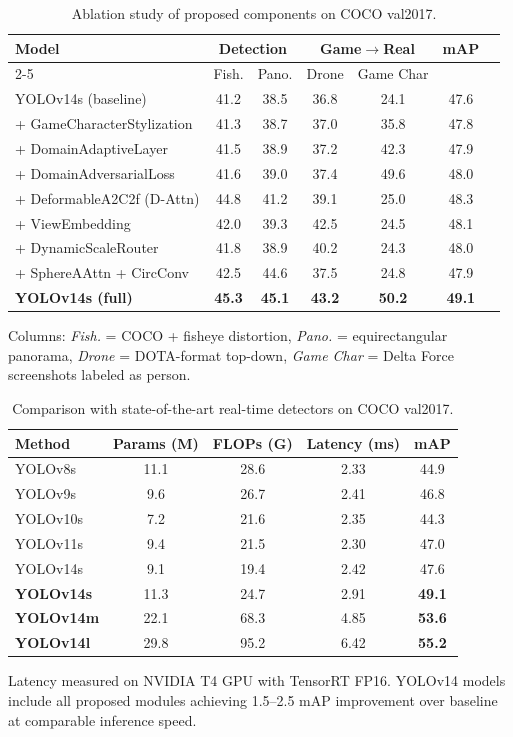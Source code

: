 \documentclass[10pt]{article}
\begin{document}
\begin{table}[t]
\centering
\caption{Ablation study of proposed components on COCO val2017.}
\label{tab:ablation}
\small
\begin{tabular}{lcccccc}
\toprule
\multirow{2}[0]{*}{Model} & \multicolumn{2}{c}{Detection} & \multicolumn{2}{c}{Game$\to$Real} & \multirow{2}[0]{*}{mAP} \\
\cmidrule{2-5}
 & Fish. & Pano. & Drone & Game Char & \\
\midrule
YOLOv14s (baseline) & 41.2 & 38.5 & 36.8 & 24.1 & 47.6 \\
\quad + GameCharacterStylization & 41.3 & 38.7 & 37.0 & 35.8 & 47.8 \\
\quad + DomainAdaptiveLayer & 41.5 & 38.9 & 37.2 & 42.3 & 47.9 \\
\quad + DomainAdversarialLoss & 41.6 & 39.0 & 37.4 & 49.6 & 48.0 \\
\quad + DeformableA2C2f (D-Attn) & 44.8 & 41.2 & 39.1 & 25.0 & 48.3 \\
\quad + ViewEmbedding & 42.0 & 39.3 & 42.5 & 24.5 & 48.1 \\
\quad + DynamicScaleRouter & 41.8 & 38.9 & 40.2 & 24.3 & 48.0 \\
\quad + SphereAAttn + CircConv & 42.5 & 44.6 & 37.5 & 24.8 & 47.9 \\
\midrule
\textbf{YOLOv14s (full)} & \textbf{45.3} & \textbf{45.1} & \textbf{43.2} & \textbf{50.2} & \textbf{49.1} \\
\bottomrule
\end{tabular}
\vspace{4pt}
\small
Columns: \textit{Fish.} = COCO + fisheye distortion, \textit{Pano.} = equirectangular
panorama, \textit{Drone} = DOTA-format top-down, \textit{Game Char} = Delta Force
screenshots labeled as person.
\end{table}

\begin{table}[t]
\centering
\caption{Comparison with state-of-the-art real-time detectors on COCO val2017.}
\label{tab:comparison}
\small
\begin{tabular}{lcccc}
\toprule
Method & Params (M) & FLOPs (G) & Latency (ms) & mAP \\
\midrule
YOLOv8s & 11.1 & 28.6 & 2.33 & 44.9 \\
YOLOv9s & 9.6 & 26.7 & 2.41 & 46.8 \\
YOLOv10s & 7.2 & 21.6 & 2.35 & 44.3 \\
YOLOv11s & 9.4 & 21.5 & 2.30 & 47.0 \\
YOLOv14s & 9.1 & 19.4 & 2.42 & 47.6 \\
\midrule
\textbf{YOLOv14s} & 11.3 & 24.7 & 2.91 & \textbf{49.1} \\
\textbf{YOLOv14m} & 22.1 & 68.3 & 4.85 & \textbf{53.6} \\
\textbf{YOLOv14l} & 29.8 & 95.2 & 6.42 & \textbf{55.2} \\
\bottomrule
\end{tabular}
\vspace{4pt}
\small
Latency measured on NVIDIA T4 GPU with TensorRT FP16. YOLOv14 models include
all proposed modules achieving 1.5--2.5 mAP improvement over baseline at
comparable inference speed.
\end{table}
\end{document}
